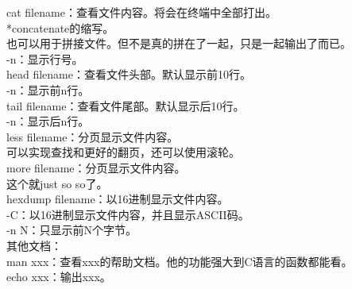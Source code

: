 \documentclass{article}
\begin{document}
\noindent
cat filename：查看文件内容。将会在终端中全部打出。\\
\hspace*{2em} *concatenate的缩写。\\
\hspace*{2em} 也可以用于拼接文件。但不是真的拼在了一起，只是一起输出了而已。\\
\hspace*{2em} -n：显示行号。\\

\noindent
head filename：查看文件头部。默认显示前10行。\\
\hspace*{2em} -n：显示前n行。\\

\noindent
tail filename：查看文件尾部。默认显示后10行。\\
\hspace*{2em} -n：显示后n行。\\

\noindent
less filename：分页显示文件内容。\\
\hspace*{2em} 可以实现查找和更好的翻页，还可以使用滚轮。\\

\noindent
more filename：分页显示文件内容。\\
\hspace*{2em} 这个就just so so了。\\

\noindent
hexdump filename：以16进制显示文件内容。\\
\hspace*{2em} -C：以16进制显示文件内容，并且显示ASCII码。\\
\hspace*{2em} -n N：只显示前N个字节。\\

\noindent
其他文档：\\
man xxx：查看xxx的帮助文档。他的功能强大到C语言的函数都能看。\\
echo xxx：输出xxx。\\
\end{document}
